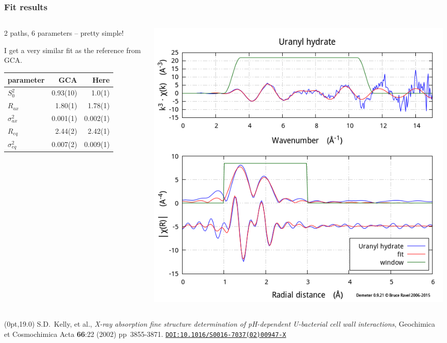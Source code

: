 \documentclass[10pt, xcolor=x11names, compress]{beamer}
\begin{document}
\begin{frame}
  \frametitle{Fit results}
  \begin{columns}[T]
    \begin{column}{0.5\linewidth}
      2 paths, 6 parameters -- pretty simple!

      \bigskip

      I get a very similar fit as the reference from GCA.

      \bigskip

      \begin{tabular}{lrr}
        \small parameter & GCA & Here \\
        \hline
        $S_0^2$         &  0.93(10) & 1.0(1) \\
        $R_{ax}$        &  1.80(1) & 1.78(1) \\
        $\sigma^2_{ax}$ &  0.001(1) & 0.002(1) \\
        $R_{eq}$        &  2.44(2) & 2.42(1) \\
        $\sigma^2_{eq}$ &  0.007(2) & 0.009(1) \\
      \end{tabular}
    \end{column}
    \begin{column}{0.5\linewidth}
      \includegraphics[width=0.85\linewidth]{images/fit.png}
    \end{column}
  \end{columns}
  \begin{textblock*}{0.7\linewidth}(0pt,19.0\TPVertModule)%
    \tiny%
    S.D.\ Kelly, et al., \textit{X-ray absorption fine structure
      determination of pH-dependent U-bacterial cell wall
      interactions}, Geochimica et Cosmochimica Acta \textbf{66}:22
    (2002) pp\  3855-3871.
    \href{http://dx.doi.org/10.1016/S0016-7037(02)00947-X}
    {\color{Blue4}\texttt{DOI:10.1016/S0016-7037(02)00947-X}}
  \end{textblock*}
\end{frame}
\end{document}
